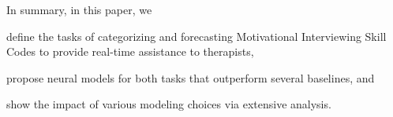 In summary, in this paper, we
\begin{inparaenum}[(1)]
\item define the tasks of categorizing and forecasting Motivational
  Interviewing Skill Codes to provide real-time assistance to
  therapists,
\item propose neural models for both tasks that outperform several
  baselines, and
\item show the impact of various modeling choices via extensive
  analysis.
\end{inparaenum}


